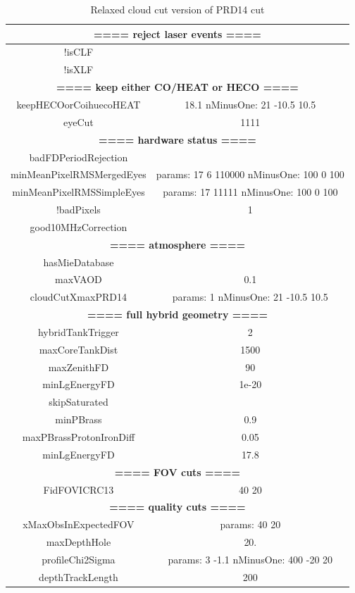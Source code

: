 \begin{table}
\centering
\begin{tabular}{|c c|}
\hline 
\multicolumn{2}{|c|}{\textbf{==== reject laser events ====}} \\ \hline
!isCLF & \\
!isXLF & \\
\hline
\multicolumn{2}{|c|}{\textbf{==== keep either CO/HEAT or HECO ====}} \\ \hline
keepHECOorCoihuecoHEAT & 18.1 { nMinusOne: 21  -10.5 10.5 } \\
eyeCut & 1111 \\
\hline
\multicolumn{2}{|c|}{\textbf{==== hardware status ====}} \\ \hline
badFDPeriodRejection & \\
minMeanPixelRMSMergedEyes & {  params: 17 6 110000 nMinusOne: 100  0 100 } \\
minMeanPixelRMSSimpleEyes & {  params: 17 11111 nMinusOne: 100  0 100 } \\
!badPixels  &               1 \\
good10MHzCorrection & \\
\hline
\multicolumn{2}{|c|}{\textbf{==== atmosphere ====}} \\ \hline
hasMieDatabase & \\
maxVAOD & 0.1 \\
cloudCutXmaxPRD14  & { params: 1 nMinusOne: 21  -10.5 10.5 } \\
\hline
\multicolumn{2}{|c|}{\textbf{==== full hybrid geometry ====}} \\ \hline
hybridTankTrigger &       2 \\
maxCoreTankDist & 1500 \\
maxZenithFD       &        90 \\
minLgEnergyFD    &        1e-20 \\
skipSaturated & \\
minPBrass         &        0.9 \\
maxPBrassProtonIronDiff &  0.05 \\
minLgEnergyFD     &       17.8 \\
\hline
\multicolumn{2}{|c|}{\textbf{==== FOV cuts ====}} \\ \hline
FidFOVICRC13 & 40 20 \\
\hline
\multicolumn{2}{|c|}{\textbf{==== quality cuts ====}} \\ \hline
xMaxObsInExpectedFOV & { params: 40 20 } \\
maxDepthHole    &     20. \\
profileChi2Sigma  &  {  params:  3 -1.1 nMinusOne: 400  -20 20 } \\
depthTrackLength   &  200 \\ \hline
\end{tabular}
\caption{Relaxed cloud cut version of PRD14 cut} \label{tab:Quality_Cuts}
\end{table}


